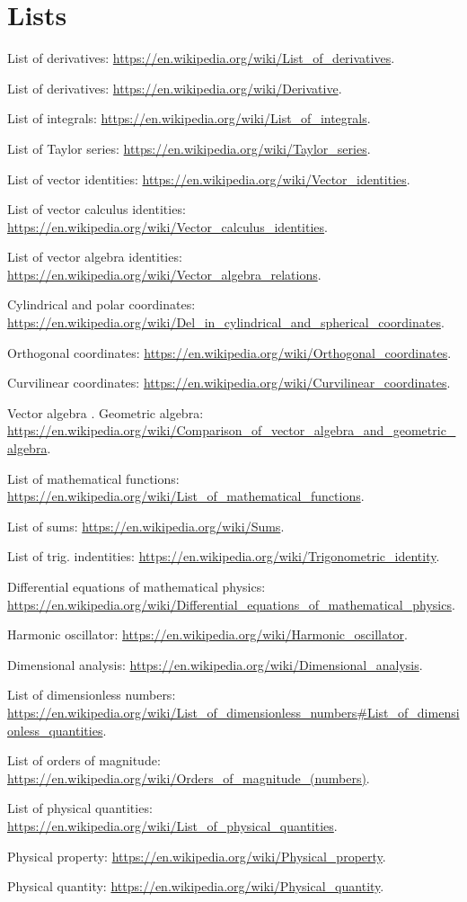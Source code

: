 \section{Lists}

List of derivatives: \url{https://en.wikipedia.org/wiki/List_of_derivatives}.

List of derivatives: \url{https://en.wikipedia.org/wiki/Derivative}.

List of integrals: \url{https://en.wikipedia.org/wiki/List_of_integrals}.

List of Taylor series: \url{https://en.wikipedia.org/wiki/Taylor_series}.

List of vector identities: \url{https://en.wikipedia.org/wiki/Vector_identities}.

List of vector calculus identities: \url{https://en.wikipedia.org/wiki/Vector_calculus_identities}.

List of vector algebra identities: \url{https://en.wikipedia.org/wiki/Vector_algebra_relations}.

Cylindrical and polar coordinates: \url{https://en.wikipedia.org/wiki/Del_in_cylindrical_and_spherical_coordinates}.

Orthogonal coordinates: \url{https://en.wikipedia.org/wiki/Orthogonal_coordinates}.

Curvilinear coordinates: \url{https://en.wikipedia.org/wiki/Curvilinear_coordinates}.

Vector algebra \vs. Geometric algebra: \url{https://en.wikipedia.org/wiki/Comparison_of_vector_algebra_and_geometric_algebra}.

List of mathematical functions: \url{https://en.wikipedia.org/wiki/List_of_mathematical_functions}.

List of sums: \url{https://en.wikipedia.org/wiki/Sums}.

List of trig. indentities: \url{https://en.wikipedia.org/wiki/Trigonometric_identity}.

Differential equations of mathematical physics: \url{https://en.wikipedia.org/wiki/Differential_equations_of_mathematical_physics}.

Harmonic oscillator: \url{https://en.wikipedia.org/wiki/Harmonic_oscillator}.

Dimensional analysis: \url{https://en.wikipedia.org/wiki/Dimensional_analysis}.

List of dimensionless numbers: \url{https://en.wikipedia.org/wiki/List_of_dimensionless_numbers#List_of_dimensionless_quantities}.

List of orders of magnitude: \url{https://en.wikipedia.org/wiki/Orders_of_magnitude_(numbers)}.

List of physical quantities: \url{https://en.wikipedia.org/wiki/List_of_physical_quantities}.

Physical property: \url{https://en.wikipedia.org/wiki/Physical_property}.

Physical quantity: \url{https://en.wikipedia.org/wiki/Physical_quantity}.

